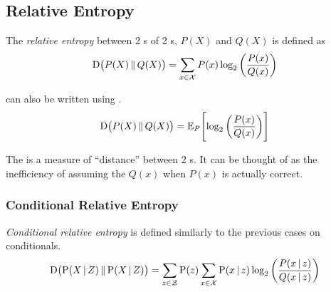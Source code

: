 \subsection{Relative Entropy}\label{subsec:Relative_Entropy}
\begin{definition}\label{def:Relative_Entropy}
  The \emph{relative entropy} between 2 s of 2 s, $P(X)$ and $Q(X)$ is defined as
  \begin{equation}\label{eq:Relative_Entropy}
    \operatorname{\operatorname{D}} \bigl( P(X) \operatorname{\Vert} Q(X) \bigr) = \sum\limits_{x \in \mathcal{X}} P(x) \log_{2} \left( \frac{P(x)}{Q(x)} \right)
  \end{equation}

   can also be written using .
  \begin{equation}\label{eq:Relative_Entropy-Expected_Value}
    \operatorname{\operatorname{D}} \bigl( P(X) \operatorname{\Vert} Q(X) \bigr) =  \operatorname{\operatorname{\mathbb{E}}}_{P} \Biggl[ \log_{2} \left( \frac{P(x)}{Q(x)} \right) \Biggr]
  \end{equation}

  \begin{remark}[Distance]\label{rmk:Relative_Entropy_Distance}
    The  is a measure of ``distance'' between 2 s.
    It can be thought of as the inefficiency of assuming the  $Q(x)$ when $P(x)$ is actually correct.
  \end{remark}
\end{definition}

\subsubsection{Conditional Relative Entropy}\label{subsubsec:Conditional_Relative_Entropy}
\begin{definition}\label{def:Conditional_Relative_Entropy}
  \emph{Conditional relative entropy} is defined similarly to the previous cases on conditionals.
  \begin{equation}\label{eq:Conditional_Relative_Entropy}
    \operatorname{\operatorname{D}} \bigl(\operatorname{\operatorname{P}}(X \operatorname{\vert} Z) \operatorname{\Vert} \operatorname{\operatorname{P}}(X \operatorname{\vert} Z) \bigr) = \sum\limits_{z \in \mathcal{Z}} \operatorname{\operatorname{P}}(z) \sum\limits_{x \in \mathcal{X}} \operatorname{\operatorname{P}}(x \operatorname{\vert} z) \log_{2} \left( \frac{P(x \operatorname{\vert} z)}{Q(x \operatorname{\vert} z)} \right)
  \end{equation}
\end{definition}


